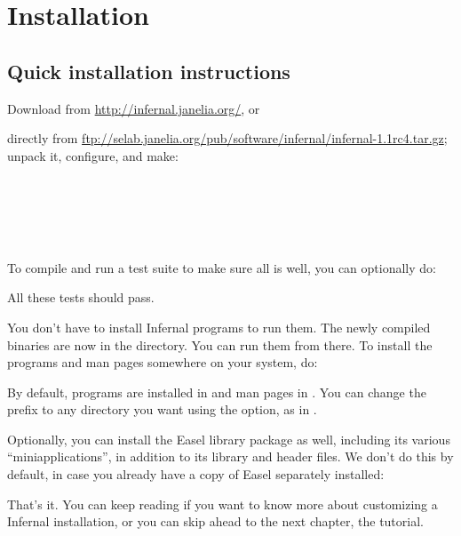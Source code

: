 \section{Installation}
\label{section:installation}
\setcounter{footnote}{0}

\subsection{Quick installation instructions}

Download  from \url{http://infernal.janelia.org/}, or

directly from
\url{ftp://selab.janelia.org/pub/software/infernal/infernal-1.1rc4.tar.gz};
unpack it, configure, and make:

\\
\\
\\
\\ 

To compile and run a test suite to make sure all is well, you can
optionally do:


All these tests should pass.

You don't have to install Infernal programs to run them. The newly
compiled binaries are now in the  directory. You can run
them from there. To install the programs and man pages somewhere on
your system, do:


By default, programs are installed in  and man
pages in . You can change the
 prefix to any directory you want using the
 option, as in .

Optionally, you can install the Easel library package as well,
including its various ``miniapplications'', in addition to its library
and header files. We don't do this by default, in case you already
have a copy of Easel separately installed:


That's it.  You can keep reading if you want to know more about
customizing a Infernal installation, or you can skip ahead to the next
chapter, the tutorial.

